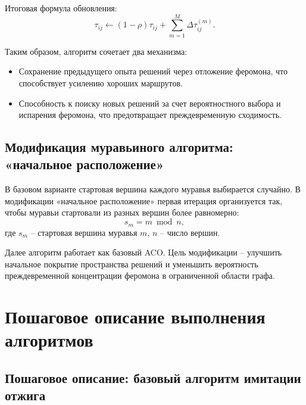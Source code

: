 \documentclass[12pt,a4paper]{article}
\begin{document}
Итоговая формула обновления:
\begin{equation}
\tau_{ij} \leftarrow (1-\rho)\tau_{ij} + \sum_{m=1}^{M}\Delta\tau_{ij}^{(m)}.
\end{equation}

Таким образом, алгоритм сочетает два механизма:
\begin{itemize}
    \item Сохранение предыдущего опыта решений через отложение феромона, что способствует усилению хороших маршрутов.
    \item Способность к поиску новых решений за счет вероятностного выбора и испарения феромона, что предотвращает преждевременную сходимость.
\end{itemize}

\subsection{Модификация муравьиного алгоритма: «начальное расположение»}

В базовом варианте стартовая вершина каждого муравья выбирается случайно.
В модификации «начальное расположение» первая итерация организуется так, чтобы
муравьи стартовали из разных вершин более равномерно:
\begin{equation}
s_m = m \bmod n,
\end{equation}
где $s_m$ -- стартовая вершина муравья $m$, $n$ -- число вершин.

Далее алгоритм работает как базовый ACO.
Цель модификации -- улучшить начальное покрытие пространства решений и уменьшить
вероятность преждевременной концентрации феромона в ограниченной области графа.

\section{Пошаговое описание выполнения алгоритмов}
\label{sec:steps}

\subsection{Пошаговое описание: базовый алгоритм имитации отжига}
\end{document}

